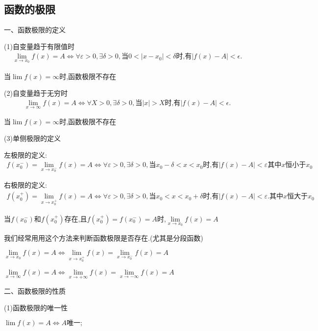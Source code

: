 \documentclass[utf8]{ctexart}
\begin{document}
\subsection{\heiti 函数的极限}

一、函数极限的定义

(1)自变量趋于有限值时
\begin{align}
    \lim\limits_{x\to x_{0}}f(x)=A\Leftrightarrow  \forall \varepsilon >0,\exists \delta >0,\text{当}0<|x-x_{0}|<\delta \text{时,有}|f(x)-A|<\epsilon.
\end{align}

当$\lim f(x)=\infty$时,函数极限不存在

(2)自变量趋于无穷时
\begin{align}
    \lim\limits_{x\to\infty }f(x)=A\Leftrightarrow \forall X >0,\exists \delta >0,\text{当}|x|>X \text{时,有}|f(x)-A|<\epsilon.
\end{align}

当$\lim f(x)=\infty$时,函数极限不存在

(3)单侧极限的定义

左极限的定义:
\begin{align}
    f(x^{-}_{0})=\lim\limits_{x\to x_{0}^{-}}f(x)=A\Leftrightarrow \forall \varepsilon >0,\exists\delta >0 ,\text{当} x_{0}-\delta <x<x_{0}\text{时,有}|f(x)-A|<\varepsilon \text{其中}x\text{恒小于}x_0
\end{align}

右极限的定义:
\begin{align}
    f(x^{+}_{0})=\lim\limits_{x\to x_{0}^{+}}f(x)=A\Leftrightarrow \forall \varepsilon >0,\exists \delta>0 ,\text{当} x_{0}<x<x_{0}+\delta \text{时,有}|f(x)-A|<\varepsilon .\text{其中}x\text{恒大于}x_0
\end{align}

当$ f(x^{-}_{0})$和$f(x^{+}_{0})$存在,且$f(x^{+}_{0})= f(x^{-}_{0}   )=A$时,$\lim\limits_{x\to x_{0}}f(x)=A$

我们经常用用这个方法来判断函数极限是否存在.(尤其是分段函数)

$\lim\limits_{x\to x_{0}} f(x)=A\Leftrightarrow \lim\limits_{x\to x_{0}^{+}}f(x)=\lim\limits_{x\to x_{0}^{-}}f(x)=A$

$\lim\limits_{x\to \infty }f(x)=A\Leftrightarrow \lim\limits_{x\to +\infty }f(x)=\lim\limits_{x\to -\infty }f(x)=A$

二、函数极限的性质

(1)函数极限的唯一性

$\displaystyle \lim f(x)=A\Leftrightarrow A\text{唯一};$
\end{document}
